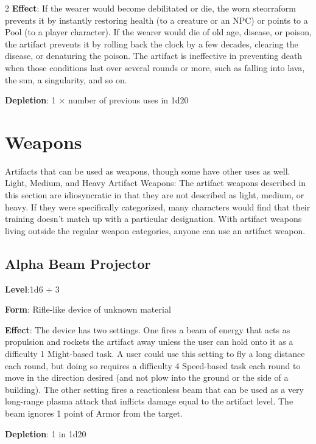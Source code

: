 \begin{multicols}{2}
\textbf{Effect}: If the wearer would become debilitated or die, the worn steorraform prevents it by instantly restoring health (to a creature or an NPC) or points to a Pool (to a player character). If the wearer would die of old age, disease, or poison, the artifact prevents it by rolling back the clock by a few decades, clearing the disease, or denaturing the poison. The artifact is ineffective in preventing death when those conditions last over several rounds or more, such as falling into lava, the sun, a singularity, and so on. 

\textbf{Depletion}: 1 × number of previous uses in 1d20

\chapter{Weapons}

Artifacts that can be used as weapons, though some have other uses as well. 
Light, Medium, and Heavy Artifact Weapons: The artifact weapons described in this section are idiosyncratic in that they are not described as light, medium, or heavy. If they were specifically categorized, many characters would find that their training doesn’t match up with a particular designation. With artifact weapons living outside the regular weapon categories, anyone can use an artifact weapon.

\section{Alpha Beam Projector}

\textbf{Level}:1d6 + 3 

\textbf{Form}: Rifle-like device of unknown material 

\textbf{Effect}: The device has two settings. One fires a beam of energy that acts as propulsion and rockets the artifact away unless the user can hold onto it as a difficulty 1 Might-based task. A user could use this setting to fly a long distance each round, but doing so requires a difficulty 4 Speed-based task each round to move in the direction desired (and not plow into the ground or the side of a building). The other setting fires a reactionless beam that can be used as a very long-range plasma attack that inflicts damage equal to the artifact level. The beam ignores 1 point of Armor from the target. 

\textbf{Depletion}: 1 in 1d20


\end{multicols}
